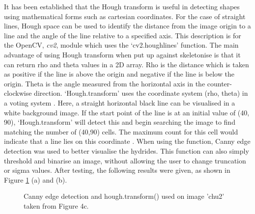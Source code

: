 \documentclass{article}
\begin{document}
	\noindent It has been established that the Hough transform is useful in detecting shapes using mathematical forms such as cartesian coordinates. For the case of straight lines, Hough space can be used to identify the distance from the image origin to a line and the angle of the line relative to a specified axis. This description is for the OpenCV, \textit{cv2}, module which uses the ‘cv2.houghlines’ function. The main advantage of using Hough transform when put up against skeletonise is that it can return rho and theta values in a 2D array. Rho is the distance which is taken as positive if the line is above the origin and negative if the line is below the origin. Theta is the angle measured from the horizontal axis in the counter-clockwise direction. ‘Hough.transform’ uses the coordinate system (rho, theta) in a voting system \cite{OpenCV2013}. Here, a straight horizontal black line can be visualised in a white background image. If the start point of the line is at an initial value of (40, 90), ‘Hough.transform’ will detect this and begin searching the image to find matching the number of (40,90) cells. The maximum count for this cell would indicate that a line lies on this coordinate \cite{OpenCV2013}. When using the function, Canny edge detection was used to better visualise the hydrides. This function can also simply threshold and binarise an image, without allowing the user to change truncation or sigma values. After testing, the following results were given, as shown in Figure \ref{Skeletonise2} (a) and (b).
	\\
	\begin{figure}[h]
		\centering
		\hfill
		\caption{Canny edge detection and hough.transform() used on image 'chu2' taken from Figure 4c. }
		\label{Skeletonise2}
	\end{figure}
	\\
\pagebreak
\end{document}
